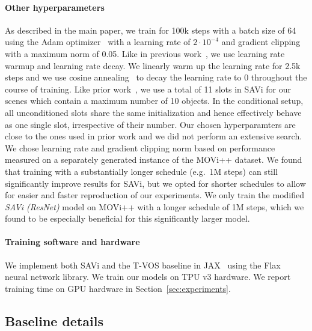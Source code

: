 \documentclass{article}
\newcommand{\modelname}{SAVi\xspace}
\begin{document}
\paragraph{Other hyperparameters}
As described in the main paper, we train for 100k steps with a batch size of 64 using the Adam optimizer~\citep{kingma2014adam} with a learning rate of $2\cdot10^{-4}$ and gradient clipping with a maximum norm of 0.05. Like in previous work~\citep{locatello2020object}, we use learning rate warmup and learning rate decay. We linearly warm up the learning rate for 2.5k steps and we use cosine annealing~\citep{loshchilov2016sgdr} to decay the learning rate to 0 throughout the course of training. Like prior work~\citep{locatello2020object}, we use a total of 11 slots in \modelname for our scenes which contain a maximum number of 10 objects. In the conditional setup, all unconditioned slots share the same initialization and hence effectively behave as one single slot, irrespective of their number. Our chosen hyperparamters are close to the ones used in prior work and we did not perform an extensive search. We chose learning rate and gradient clipping norm based on performance measured on a separately generated instance of the MOVi++ dataset. We found that training with a substantially longer schedule (e.g.~1M steps) can still significantly improve results for SAVi, but we opted for shorter schedules to allow for easier and faster reproduction of our experiments. We only train the modified \textit{SAVi (ResNet)} model on MOVi++ with a longer schedule of 1M steps, which we found to be especially beneficial for this significantly larger model.

\paragraph{Training software and hardware}
We implement both SAVi and the T-VOS baseline in JAX~\citep{jax2018github} using the Flax~\citep{flax2020github} neural network library. We train our models on TPU v3 hardware. We report training time on GPU hardware in Section~\ref{sec:experiments}.

\subsection{Baseline details}
\label{app:baselines}
\end{document}
